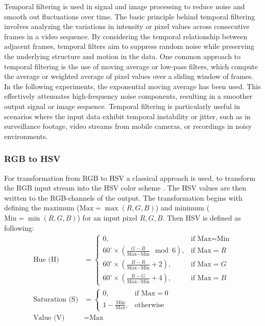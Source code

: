 \documentclass[sigchi,screen]{acmart}
\begin{document}
Temporal filtering is used in signal and image processing to reduce noise and smooth out fluctuations over time. The basic principle behind temporal filtering involves analyzing the variations in intensity or pixel values across consecutive frames in a video sequence. By considering the temporal relationship between adjacent frames, temporal filters aim to suppress random noise while preserving the underlying structure and motion in the data. One common approach to temporal filtering is the use of moving average or low-pass filters, which compute the average or weighted average of pixel values over a sliding window of frames. In the following experiments, the exponential moving average has been used. This effectively attenuates high-frequency noise components, resulting in a smoother output signal or image sequence. Temporal filtering is particularly useful in scenarios where the input data exhibit temporal instability or jitter, such as in surveillance footage, video streams from mobile cameras, or recordings in noisy environments. 

\subsubsection{RGB to HSV}
\label{ch:pp-hsv}
For transformation from RGB to HSV a classical approach is used, to transform the RGB input stream into the HSV color scheme \cite{CHERNOV2015328}. The HSV values are then written to the RGB-channels of the output. The transformation begins with defining the maximum ($\text{Max} = \max(R, G, B)$) and minimum ($\text{Min} = \min(R, G, B)$) for an input pixel $R, G, B$. Then HSV is defined as following:
\[
\begin{aligned}
    \text{Hue (H)} &= \begin{cases}
            0, & \text{if } \text{Max} = \text{Min} \\
            60^\circ \times \left( \frac{G - B}{\text{Max} - \text{Min}} \mod 6 \right), & \text{if } \text{Max} = R \\
            60^\circ \times \left( \frac{B - R}{\text{Max} - \text{Min}} + 2 \right), & \text{if } \text{Max} = G \\
            60^\circ \times \left( \frac{R - G}{\text{Max} - \text{Min}} + 4 \right), & \text{if } \text{Max} = B
        \end{cases} \\
     \text{Saturation (S)} &= \begin{cases}
        0, & \text{if } \text{Max} = 0 \\
        1 - \frac{\text{Min}}{\text{Max}}, & \text{otherwise}
    \end{cases} \\
    \text{Value (V)} &= \text{Max}
\end{aligned}
\]
\end{document}
